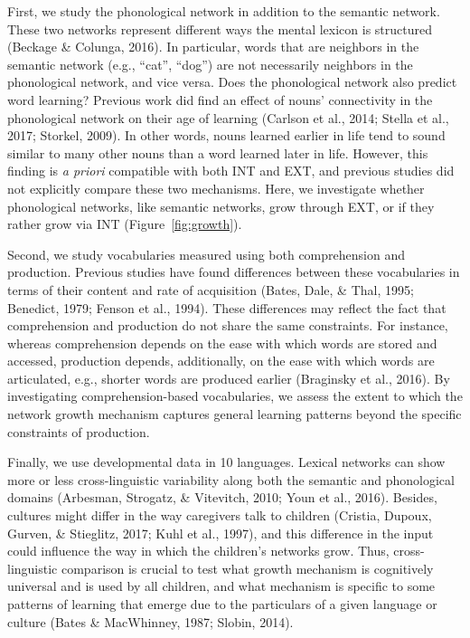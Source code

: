\documentclass[english,floatsintext,man]{apa6}
\theoremstyle{definition}
\theoremstyle{definition}
\theoremstyle{definition}
\theoremstyle{remark}
\begin{document}
First, we study the phonological network in addition to the semantic
network. These two networks represent different ways the mental lexicon
is structured (Beckage \& Colunga, 2016). In particular, words that are
neighbors in the semantic network (e.g., \enquote{cat}, \enquote{dog})
are not necessarily neighbors in the phonological network, and vice
versa. Does the phonological network also predict word learning?
Previous work did find an effect of nouns' connectivity in the
phonological network on their age of learning (Carlson et al., 2014;
Stella et al., 2017; Storkel, 2009). In other words, nouns learned
earlier in life tend to sound similar to many other nouns than a word
learned later in life. However, this finding is \emph{a priori}
compatible with both INT and EXT, and previous studies did not
explicitly compare these two mechanisms. Here, we investigate whether
phonological networks, like semantic networks, grow through EXT, or if
they rather grow via INT (Figure~\ref{fig:growth}).

Second, we study vocabularies measured using both comprehension and
production. Previous studies have found differences between these
vocabularies in terms of their content and rate of acquisition (Bates,
Dale, \& Thal, 1995; Benedict, 1979; Fenson et al., 1994). These
differences may reflect the fact that comprehension and production do
not share the same constraints. For instance, whereas comprehension
depends on the ease with which words are stored and accessed, production
depends, additionally, on the ease with which words are articulated,
e.g., shorter words are produced earlier (Braginsky et al., 2016). By
investigating comprehension-based vocabularies, we assess the extent to
which the network growth mechanism captures general learning patterns
beyond the specific constraints of production.

Finally, we use developmental data in 10 languages. Lexical networks can
show more or less cross-linguistic variability along both the semantic
and phonological domains (Arbesman, Strogatz, \& Vitevitch, 2010; Youn
et al., 2016). Besides, cultures might differ in the way caregivers talk
to children (Cristia, Dupoux, Gurven, \& Stieglitz, 2017; Kuhl et al.,
1997), and this difference in the input could influence the way in which
the children's networks grow. Thus, cross-linguistic comparison is
crucial to test what growth mechanism is cognitively universal and is
used by all children, and what mechanism is specific to some patterns of
learning that emerge due to the particulars of a given language or
culture (Bates \& MacWhinney, 1987; Slobin, 2014).
\end{document}
